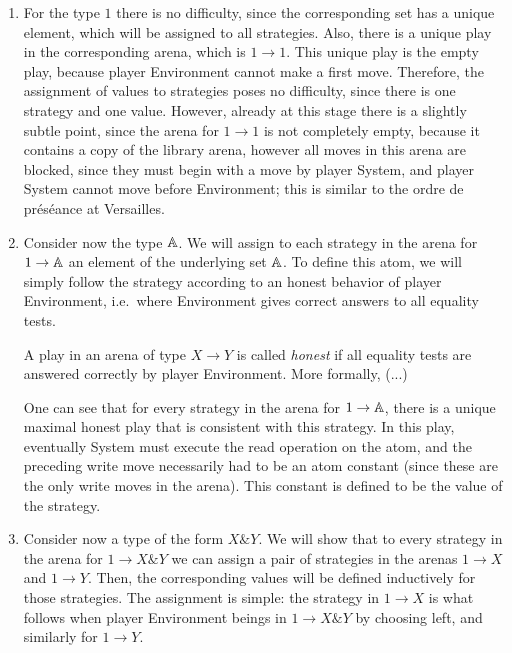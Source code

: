 \begin{enumerate}
    \item For the type $1$ there is no difficulty, since the corresponding set has a unique element, which will be assigned to all strategies. Also, there is a unique play in the corresponding arena, which is $1 \to 1$. This unique play is  the empty play,  because player Environment cannot make a first move. Therefore, the assignment of values to strategies poses no difficulty, since there is one strategy and one value.  However, already at this stage there is a slightly subtle point, since the arena for $1 \to 1$ is not completely empty, because it  contains a copy of the library arena, however all moves in this arena are blocked, since they must begin with a move by player System, and player System cannot  move before Environment; this is similar to the ordre de préséance at Versailles.
    \item Consider now the type  $\mathbb A$. We will assign to each strategy in the arena for $1 \to \mathbb A$ an element of the underlying set $\mathbb A$. To define this atom, we will simply follow the strategy according to an honest behavior of player Environment, i.e.~where Environment gives correct answers to all equality tests. 
    
    \begin{definition}
        A play in an arena of type $X \to Y$ is called \emph{honest} if all equality tests are answered correctly by player Environment. More formally, (...)
    \end{definition}

    One can see that for every strategy in the arena for $1 \to \mathbb A$, there is a unique maximal honest play that is consistent with this strategy. In this play, eventually System must execute the read operation on the atom, and the preceding write move necessarily had to be an atom constant (since these are the only write moves in the arena). This constant is defined to be the value of the strategy. 

    \item Consider now  a type of the form $X \& Y$. We will show that to every strategy in the arena for $1 \to X \& Y$ we can assign a pair of strategies in the arenas $1 \to X$ and $1 \to Y$. Then, the corresponding values will be defined inductively for those strategies. The assignment is simple: the strategy in $1 \to X$ is what follows when player Environment beings in $1 \to X \& Y$ by choosing left, and similarly for $1 \to Y$.
    

\end{enumerate}
